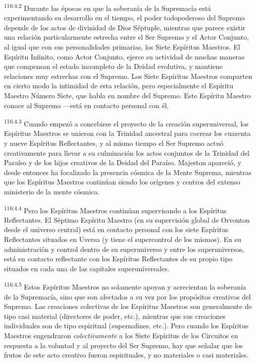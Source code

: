 \documentclass[twoside, 11pt]{book}
\begin{document}
\par
\textsuperscript{116:4.2} Durante las épocas en que la soberanía de la Supremacía está experimentando su desarrollo en el tiempo, el poder todopoderoso del Supremo depende de los actos de divinidad de Dios Séptuple, mientras que parece existir una relación particularmente estrecha entre el Ser Supremo y el Actor Conjunto, al igual que con sus personalidades primarias, los Siete Espíritus Maestros. El Espíritu Infinito, como Actor Conjunto, ejerce su actividad de muchas maneras que compensan el estado incompleto de la Deidad evolutiva, y mantiene relaciones muy estrechas con el Supremo. Los Siete Espíritus Maestros comparten en cierto modo la intimidad de esta relación, pero especialmente el Espíritu Maestro Número Siete, que habla en nombre del Supremo. Este Espíritu Maestro conoce al Supremo ---está en contacto personal con él.

\par
\textsuperscript{116:4.3} Cuando empezó a concebirse el proyecto de la creación superuniversal, los Espíritus Maestros se unieron con la Trinidad ancestral para cocrear los cuarenta y nueve Espíritus Reflectantes, y al mismo tiempo el Ser Supremo actuó creativamente para llevar a su culminación los actos conjuntos de la Trinidad del Paraíso y de los hijos creativos de la Deidad del Paraíso. Majeston apareció, y desde entonces ha focalizado la presencia cósmica de la Mente Suprema, mientras que los Espíritus Maestros continúan siendo los orígenes y centros del extenso ministerio de la mente cósmica.

\par
\textsuperscript{116:4.4} Pero los Espíritus Maestros continúan supervisando a los Espíritus Reflectantes. El Séptimo Espíritu Maestro (en su supervisión global de Orvonton desde el universo central) está en contacto personal con los siete Espíritus Reflectantes situados en Uversa (y tiene el supercontrol de los mismos). En su administración y control dentro de su superuniverso y entre los superuniversos, está en contacto reflectante con los Espíritus Reflectantes de su propio tipo situados en cada una de las capitales superuniversales.

\par
\textsuperscript{116:4.5} Estos Espíritus Maestros no solamente apoyan y acrecientan la soberanía de la Supremacía, sino que son afectados a su vez por los propósitos creativos del Supremo. Las creaciones colectivas de los Espíritus Maestros son generalmente de tipo casi material (directores de poder, etc.), mientras que sus creaciones individuales son de tipo espiritual (supernafines, etc.). Pero cuando los Espíritus Maestros engendraron \textit{colectivamente} a los Siete Espíritus de los Circuitos en respuesta a la voluntad y al proyecto del Ser Supremo, hay que señalar que los frutos de este acto creativo fueron espirituales, y no materiales o casi materiales.
\end{document}
